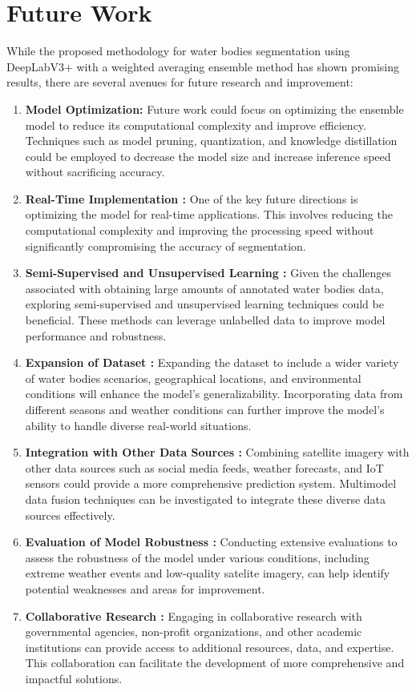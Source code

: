 \section{Future Work}
While the proposed methodology for water bodies segmentation using DeepLabV3+ with a weighted averaging ensemble method has shown promising results, there are several avenues for future research and improvement:
\begin{enumerate}
 \item \textbf{Model Optimization: }Future work could focus on optimizing the ensemble model to reduce its computational complexity and improve efficiency. Techniques such as model pruning, quantization, and knowledge distillation could be employed to decrease the model size and increase inference speed without sacrificing accuracy.
    \item \textbf{Real-Time Implementation : }One of the key future directions is optimizing the model for real-time applications. This involves reducing the computational complexity and improving the processing speed without significantly compromising the accuracy of segmentation.
    \item \textbf{Semi-Supervised and Unsupervised Learning : }Given the challenges associated with obtaining large amounts of annotated water bodies data, exploring semi-supervised and unsupervised learning techniques could be beneficial. These methods can leverage unlabelled data to improve model performance and robustness.
    \item \textbf{Expansion of Dataset : }Expanding the dataset to include a wider variety of water bodies scenarios, geographical locations, and environmental conditions will enhance the model's generalizability. Incorporating data from different seasons and weather conditions can further improve the model's ability to handle diverse real-world situations.
    \item \textbf{Integration with Other Data Sources : }Combining satellite imagery with other data sources such as social media feeds, weather forecasts, and IoT sensors could provide a more comprehensive prediction system. Multimodel data fusion techniques can be investigated to integrate these diverse data sources effectively.
    \item \textbf{Evaluation of Model Robustness : }Conducting extensive evaluations to assess the robustness of the model under various conditions, including extreme weather events and low-quality satelite imagery, can help identify potential weaknesses and areas for improvement.
    \item \textbf{Collaborative Research : } Engaging in collaborative research with governmental agencies, non-profit organizations, and other academic institutions can provide access to additional resources, data, and expertise. This collaboration can facilitate the development of more comprehensive and impactful solutions.
    
\end{enumerate}
    


